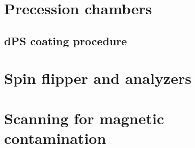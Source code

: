 
\section{Precession chambers}



\subsection{dPS coating procedure}





\section{Spin flipper and analyzers}\label{sec:spin_flipper_analyzer}



\section{Scanning for magnetic contamination}

